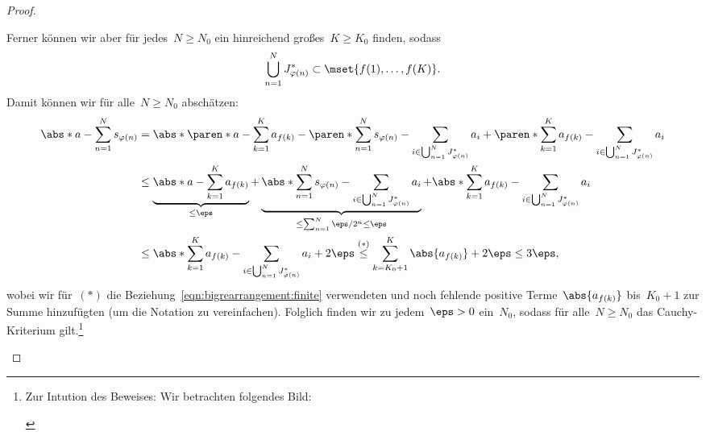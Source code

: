 \documentclass[a4paper]{article}
\begin{document}
\begin{proof}
\begin{enumerate}
              Ferner können wir aber für jedes~$N \geq N_0$ ein hinreichend großes~$K \geq K_0$ finden, sodass
              \begin{equation*}
                  \bigcup_{n=1}^N J^*_{\varphi(n)} \subset \mset{f(1),\dots,f(K)}.
              \end{equation*}
              Damit können wir für alle~$N \geq N_0$ abschätzen:
              \begin{align*}
                  \abs*{a - \sum_{n=1}^N s_{\varphi(n)}} &= \abs*{
                      \paren*{a - \sum_{k=1}^K a_{f(k)}}
                      - \paren*{\sum_{n=1}^N s_{\varphi(n)} - \sum_{i\in\bigcup_{n=1}^N J^*_{\varphi(n)}} a_i}
                      + \paren*{\sum_{k=1}^K a_{f(k)} - \sum_{i\in\bigcup_{n=1}^N J^*_{\varphi(n)}} a_i}} \\
                &\leq \underbrace{\abs*{a - \sum_{k=1}^K a_{f(k)}}}_{\leq \eps}
                      + \underbrace{\abs*{\sum_{n=1}^N s_{\varphi(n)} - \sum_{i\in\bigcup_{n=1}^N J^*_{\varphi(n)}} a_i}}_{\leq \sum_{n=1}^N \eps/2^n \leq \eps}
                      + \abs*{\sum_{k=1}^K a_{f(k)} - \sum_{i\in\bigcup_{n=1}^N J^*_{\varphi(n)}} a_i} \\
                &\leq \abs*{\sum_{k=1}^K a_{f(k)} - \sum_{i\in\bigcup_{n=1}^N J^*_{\varphi(n)}} a_i} + 2\eps \overset{(*)}{\leq} \sum_{k=K_0+1}^{K} \abs{a_{f(k)}} + 2\eps \leq 3\eps,
              \end{align*}
              wobei wir für~$(*)$ die Beziehung~\cref{eqn:bigrearrangement:finite} verwendeten und noch fehlende positive Terme~$\abs{a_{f(k)}}$ bis~$K_0+1$ zur Summe hinzufügten (um die Notation zu vereinfachen). Folglich finden wir zu jedem~$\eps > 0$ ein~$N_0$, sodass für alle~$N \geq N_0$ das Cauchy-Kriterium gilt.\footnote{Zur Intution des Beweises: Wir betrachten folgendes Bild:
              \begin{center}
\end{center}}
\end{enumerate}
\end{proof}
\end{document}
